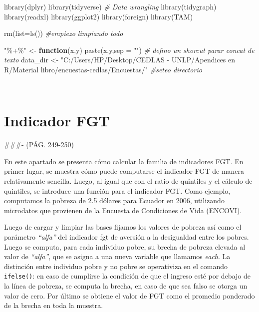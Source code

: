 \documentclass[
]{book}
\newenvironment{Shaded}{\begin{snugshade}}{\end{snugshade}}
\newcommand{\AttributeTok}[1]{\textcolor[rgb]{0.77,0.63,0.00}{#1}}
\newcommand{\CommentTok}[1]{\textcolor[rgb]{0.56,0.35,0.01}{\textit{#1}}}
\newcommand{\ControlFlowTok}[1]{\textcolor[rgb]{0.13,0.29,0.53}{\textbf{#1}}}
\newcommand{\FunctionTok}[1]{\textcolor[rgb]{0.00,0.00,0.00}{#1}}
\newcommand{\NormalTok}[1]{#1}
\newcommand{\OtherTok}[1]{\textcolor[rgb]{0.56,0.35,0.01}{#1}}
\newcommand{\StringTok}[1]{\textcolor[rgb]{0.31,0.60,0.02}{#1}}
\begin{document}
\begin{Shaded}
\begin{Highlighting}[]
\FunctionTok{library}\NormalTok{(dplyr)}
\FunctionTok{library}\NormalTok{(tidyverse) }\CommentTok{\# Data wrangling}
\FunctionTok{library}\NormalTok{(tidygraph)}
\FunctionTok{library}\NormalTok{(readxl)}
\FunctionTok{library}\NormalTok{(ggplot2)}
\FunctionTok{library}\NormalTok{(foreign)}
\FunctionTok{library}\NormalTok{(TAM)}

\FunctionTok{rm}\NormalTok{(}\AttributeTok{list=}\FunctionTok{ls}\NormalTok{())    }\CommentTok{\#empiezo limpiando todo }

\StringTok{"\%+\%"} \OtherTok{\textless{}{-}} \ControlFlowTok{function}\NormalTok{(x,y) }\FunctionTok{paste}\NormalTok{(x,y,}\AttributeTok{sep =} \StringTok{""}\NormalTok{)      }\CommentTok{\# defino un shorcut parar concat de texto}
\NormalTok{data\_dir }\OtherTok{\textless{}{-}} \StringTok{"C:/Users/HP/Desktop/CEDLAS {-} UNLP/Apendices en R/Material libro/encuestas{-}cedlas/Encuestas/"}  \CommentTok{\#seteo directorio }
\end{Highlighting}
\end{Shaded}

~

\hypertarget{indicador-fgt}{%
\section{Indicador FGT}\label{indicador-fgt}}

\#\#\#- (PÁG. 249-250)

En este apartado se presenta cómo calcular la familia de indicadores FGT. En primer lugar, se muestra cómo puede computarse el indicador FGT de manera relativamente sencilla. Luego, al igual que con el ratio de quintiles y el cálculo de quintiles, se introduce una función para el indicador FGT. Como ejemplo, computamos la pobreza de 2.5 dólares para Ecuador en 2006, utilizando microdatos que provienen de la Encuesta de Condiciones de Vida (ENCOVI).

Luego de cargar y limpiar las bases fijamos los valores de pobreza así como el parámetro \emph{``alfa''} del indicador fgt de aversión a la desigualdad entre los pobres. Luego se computa, para cada individuo pobre, su brecha de pobreza elevada al valor de \emph{``alfa''}, que se asigna a una nueva variable que llamamos \emph{each}. La distinción entre individuo pobre y no pobre se operativiza en el comando \texttt{ifelse()}: en caso de cumplirse la condición de que el ingreso esté por debajo de la línea de pobreza, se computa la brecha, en caso de que sea falso se otorga un valor de cero. Por último se obtiene el valor de FGT como el promedio ponderado de la brecha en toda la muestra.
\end{document}
